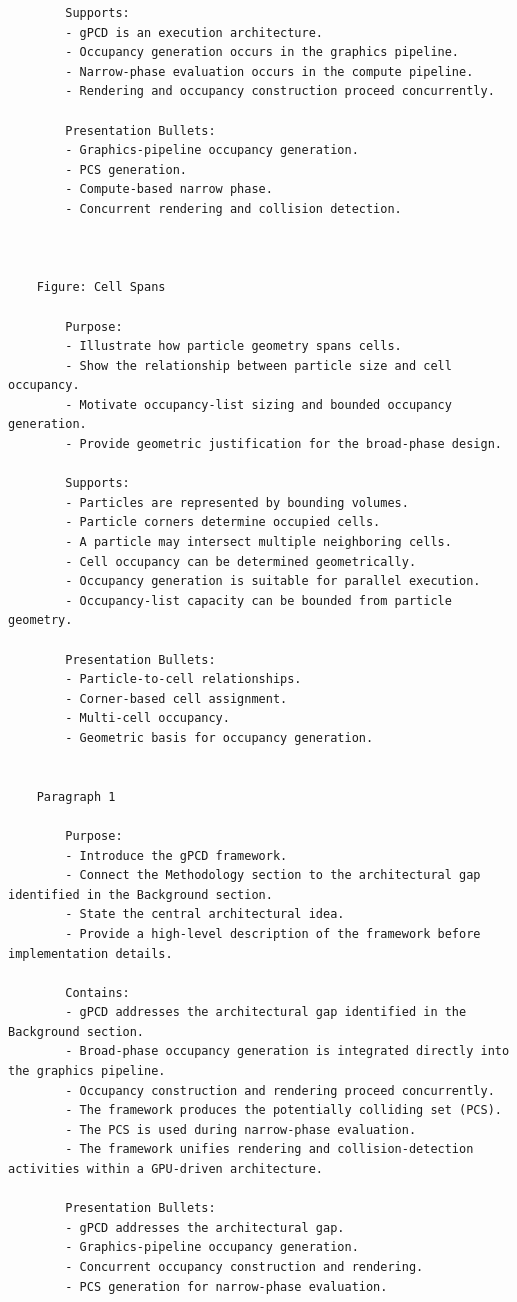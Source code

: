 \begin{verbatim}
		Supports:
		- gPCD is an execution architecture.
		- Occupancy generation occurs in the graphics pipeline.
		- Narrow-phase evaluation occurs in the compute pipeline.
		- Rendering and occupancy construction proceed concurrently.

		Presentation Bullets:
		- Graphics-pipeline occupancy generation.
		- PCS generation.
		- Compute-based narrow phase.
		- Concurrent rendering and collision detection.
   
 

	Figure: Cell Spans

		Purpose:
		- Illustrate how particle geometry spans cells.
		- Show the relationship between particle size and cell occupancy.
		- Motivate occupancy-list sizing and bounded occupancy generation.
		- Provide geometric justification for the broad-phase design.

		Supports:
		- Particles are represented by bounding volumes.
		- Particle corners determine occupied cells.
		- A particle may intersect multiple neighboring cells.
		- Cell occupancy can be determined geometrically.
		- Occupancy generation is suitable for parallel execution.
		- Occupancy-list capacity can be bounded from particle geometry.

		Presentation Bullets:
		- Particle-to-cell relationships.
		- Corner-based cell assignment.
		- Multi-cell occupancy.
		- Geometric basis for occupancy generation.  
   

	Paragraph 1

		Purpose:
		- Introduce the gPCD framework.
		- Connect the Methodology section to the architectural gap identified in the Background section.
		- State the central architectural idea.
		- Provide a high-level description of the framework before implementation details.

		Contains:
		- gPCD addresses the architectural gap identified in the Background section.
		- Broad-phase occupancy generation is integrated directly into the graphics pipeline.
		- Occupancy construction and rendering proceed concurrently.
		- The framework produces the potentially colliding set (PCS).
		- The PCS is used during narrow-phase evaluation.
		- The framework unifies rendering and collision-detection activities within a GPU-driven architecture.

		Presentation Bullets:
		- gPCD addresses the architectural gap.
		- Graphics-pipeline occupancy generation.
		- Concurrent occupancy construction and rendering.
		- PCS generation for narrow-phase evaluation.
   

\end{verbatim}
